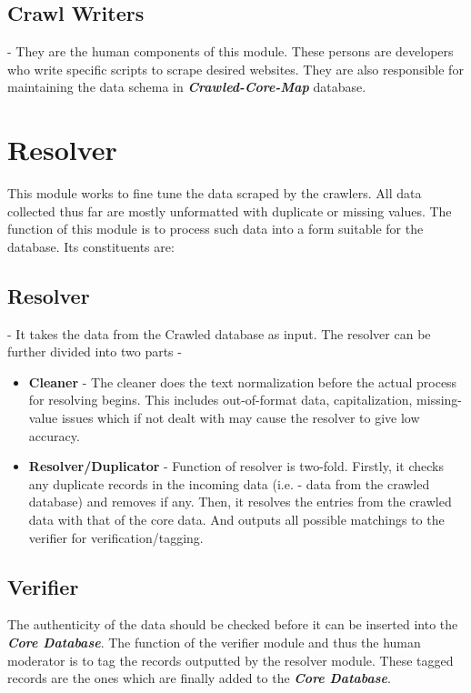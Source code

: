 \subsection{\textbf{Crawl Writers}} - They are the human components of this module. These persons are developers who write specific scripts to scrape desired websites. They are also responsible for maintaining the data schema in \emph{\textbf{Crawled-Core-Map}} database.



\section{Resolver}
This module works to fine tune the data scraped by the crawlers. All data collected thus far are mostly unformatted with duplicate or missing values. The function of this module is to process such data into a form suitable for the database.
Its constituents are:


\subsection{\textbf{Resolver}} - It takes the data from the Crawled database as input. The resolver can be further divided into two parts -

\begin{itemize}
\item\textbf{Cleaner} - The cleaner does the text normalization before the actual process for resolving begins. This includes out-of-format data, capitalization, missing-value issues which if not dealt with may cause the resolver to give low accuracy.
\item\textbf{Resolver/Duplicator} - Function of resolver is two-fold. Firstly, it checks any duplicate records in the incoming data (i.e. - data from the crawled database) and removes if any. Then, it resolves the entries from the crawled data with that of the core data. And outputs all possible matchings to the verifier for verification/tagging. 
\end{itemize}

\subsection{\textbf{Verifier}} The authenticity of the data should be checked before it can be inserted into the \emph{\textbf{Core Database}}.  The function of the verifier module and thus the human moderator is to tag the records outputted by the resolver module. These tagged records are the ones which are finally added to the \emph{\textbf{Core Database}}.


